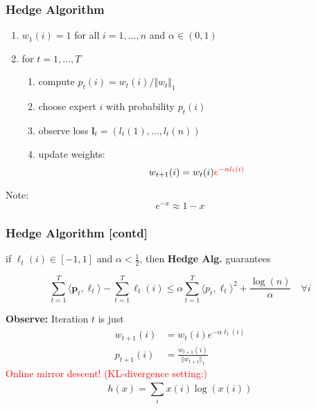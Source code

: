 \documentclass{beamer}
\begin{document}
\begin{frame}
  \frametitle{Hedge Algorithm}
  \begin{enumerate}
    \item $w_1(i) = 1$ for all $i = 1, \dots, n$ and $\alpha \in (0, 1)$
    \item for $t=1, \dots, T$
      \begin{enumerate}
        \item compute $p_t(i) = w_t(i)/\Vert w_t \Vert_1$
        \item choose expert $i$ with probability $p_t(i)$
        \item observe loss $\bm{l}_t= (l_t(1), \dots, l_t(n))$
        \item update weights:
          \begin{equation}
            w_{t+1}(i) =  w_t(i) \textcolor{red}{e^{-\alpha l_t(i)}}
          \end{equation}
      \end{enumerate}
  \end{enumerate}
  Note:
  \begin{equation}
    e^{-x} \approx 1-x
  \end{equation}

\end{frame}


\begin{frame}
  \frametitle{Hedge Algorithm [contd]}

  \begin{theorem}
    if $\ell_t(i) \in [-1, 1]$ and $\alpha < \frac12$, then \textbf{Hedge Alg.} guarantees

    \begin{equation}
      \sum_{t=1}^{T} \langle \bm{p}_t, \bm{\ell}_t \rangle  - \sum_{t=1}^{T} \ell_t(i) \le \alpha \sum_{t=1}^{T} \langle p_t, \ell_t \rangle^2 + \frac{\log(n)}{\alpha} \quad \forall i
    \end{equation}
  \end{theorem}
  \textbf{Observe:} Iteration $t$ is just
  \begin{equation}
    \begin{aligned}
      w_{t+1}(i) &= w_t(i) e^{-\alpha \ell_t(i)} \\
      p_{t+1}(i) &= \frac{w_{t+1}(i)}{\Vert w_{t+1}\Vert_1}
    \end{aligned}
  \end{equation}
  \textcolor{red}{Online mirror descent!}
  \textcolor{red}{(KL-divergence setting:)}
  \begin{equation}
    h(x) = \sum_{i}^{} x(i) \log(x(i))
  \end{equation}

\end{frame}
\end{document}
